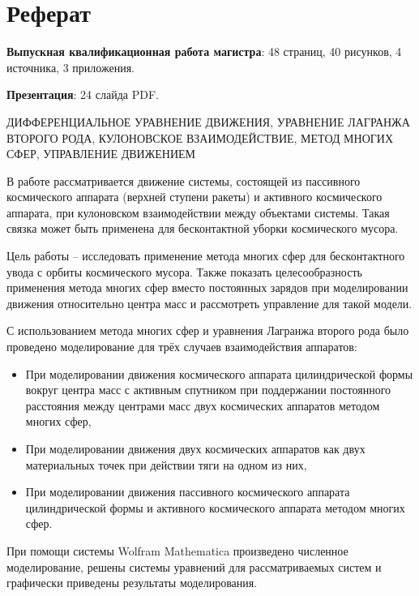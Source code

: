 \section*{Реферат}
\textbf{Выпускная квалификационная работа магистра}: 48 страниц, 40 рисунков, 4 источника, 3 приложения. 

\textbf{Презентация}: 24 слайда PDF.

\hspace{1pt}

ДИФФЕРЕНЦИАЛЬНОЕ УРАВНЕНИЕ ДВИЖЕНИЯ, УРАВНЕНИЕ ЛАГРАНЖА ВТОРОГО РОДА, КУЛОНОВСКОЕ ВЗАИМОДЕЙСТВИЕ, МЕТОД МНОГИХ СФЕР, УПРАВЛЕНИЕ ДВИЖЕНИЕМ

\hspace{1pt}

В работе рассматривается движение системы, состоящей из пассивного космического аппарата (верхней ступени ракеты) и активного космического аппарата, при кулоновском взаимодействии между объектами системы.
Такая связка может быть применена для бесконтактной уборки космического мусора.

Цель работы – исследовать применение метода многих сфер  для бесконтактного увода с орбиты космического мусора.
Также показать целесообразность применения метода многих сфер вместо постоянных зарядов при моделировании движения относительно центра масс и рассмотреть управление для такой модели.

С использованием метода многих сфер и уравнения Лагранжа второго рода было проведено моделирование для трёх случаев взаимодействия аппаратов:
\begin{itemize}
	\item При моделировании движения космического аппарата цилиндрической формы вокруг центра масс с активным спутником при поддержании постоянного расстояния между центрами масс двух космических аппаратов методом многих сфер,
	\item При моделировании движения двух космических аппаратов как двух материальных точек при действии тяги на одном из них,
	\item При моделировании движения пассивного космического аппарата цилиндрической формы и активного космического аппарата методом многих сфер.
\end{itemize}
При помощи системы Wolfram Mathematica произведено численное моделирование, решены системы уравнений для рассматриваемых систем и графически приведены результаты моделирования.